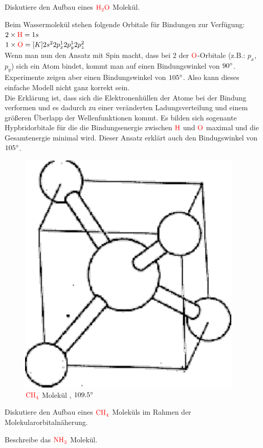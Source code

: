 \documentclass[a5paper,12pt,ngerman,print,grid=front]{kartei}
\let\oldce\ce
\renewcommand*{\ce}[1]{\begingroup\color{red}\oldce{#1}\endgroup}
\begin{document}
	\begin{karte}{
		Diskutiere den Aufbau eines $\ce{H2O}$ Molekül.
		}
		
		Beim Wassermolekül stehen folgende Orbitale für Bindungen zur Verfügung: \\
		$  2 \times \ce{H} = 1s  $ \\
		$  1 \times \ce{O} = [K] 2s^2 2p_x^1 2p_y^1 2p_z^2  $ \\
		Wenn man nun den Ansatz mit Spin macht, dass bei 2 der $ \ce{O} $-Orbitale (z.B.: $p_x$, $p_y$) sich ein  Atom bindet, kommt man auf einen Bindungswinkel von $90\degree$.
		Experimente zeigen aber einen Bindungswinkel von $105\degree$. Also kann dieses einfache Modell nicht ganz korrekt sein. \\
		
		Die Erklärung ist, dass sich die Elektronenhüllen der Atome bei der Bindung verformen und es dadurch zu einer veränderten Ladungsverteilung und einem größeren Überlapp der Wellenfunktionen kommt. Es bilden sich sogenante Hypbridorbitale für die die Bindungsenergie zwischen $\ce{H}$ und $\ce{O}$ maximal und die Gesamtenergie minimal wird. Dieser Ansatz erklärt auch den Bindugswinkel von $105\degree$.
		
		\begin{figure}[htbp]
			\centering
			\includegraphics[width=0.2\linewidth]{./images/18_CH4}
			\caption{$\ce{CH4}$ Molekül , $109.5\degree$ }
			\label{fig:18_CH4}
		\end{figure}
		
	\end{karte}


	\begin{karte}{
		Diskutiere den Aufbau eines $\ce{CH4}$ Moleküls im Rahmen der Molekularorbitalnäherung.
		}
		
		
		
	\end{karte}


	\begin{karte}{
		Beschreibe das $\ce{NH3}$ Molekül.
		}
		
		
		
	\end{karte}
\end{document}
